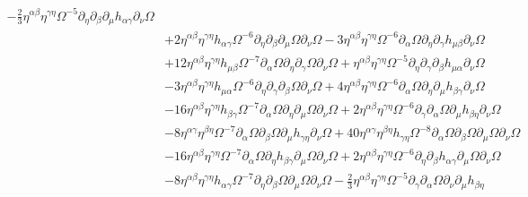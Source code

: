 \documentclass[10pt,letterpaper]{article}
\begin{document}
\begin{align}
 -  \tfrac{2}{3} \eta^{\alpha \beta} \eta^{\gamma \eta} \Omega^{-5} \partial_{\eta}\partial_{\beta}\partial_{\mu}h_{\alpha \gamma} \partial_{\nu}\Omega\nonumber\\
& + 2 \eta^{\alpha \beta} \eta^{\gamma \eta} h_{\alpha \gamma} \Omega^{-6} \partial_{\eta}\partial_{\beta}\partial_{\mu}\Omega \partial_{\nu}\Omega
 - 3 \eta^{\alpha \beta} \eta^{\gamma \eta} \Omega^{-6} \partial_{\alpha}\Omega \partial_{\eta}\partial_{\gamma}h_{\mu \beta} \partial_{\nu}\Omega\nonumber\\
& + 12 \eta^{\alpha \beta} \eta^{\gamma \eta} h_{\mu \beta} \Omega^{-7} \partial_{\alpha}\Omega \partial_{\eta}\partial_{\gamma}\Omega \partial_{\nu}\Omega
 + \eta^{\alpha \beta} \eta^{\gamma \eta} \Omega^{-5} \partial_{\eta}\partial_{\gamma}\partial_{\beta}h_{\mu \alpha} \partial_{\nu}\Omega\nonumber\\
& - 3 \eta^{\alpha \beta} \eta^{\gamma \eta} h_{\mu \alpha} \Omega^{-6} \partial_{\eta}\partial_{\gamma}\partial_{\beta}\Omega \partial_{\nu}\Omega
 + 4 \eta^{\alpha \beta} \eta^{\gamma \eta} \Omega^{-6} \partial_{\alpha}\Omega \partial_{\eta}\partial_{\mu}h_{\beta \gamma} \partial_{\nu}\Omega\nonumber\\
& - 16 \eta^{\alpha \beta} \eta^{\gamma \eta} h_{\beta \gamma} \Omega^{-7} \partial_{\alpha}\Omega \partial_{\eta}\partial_{\mu}\Omega \partial_{\nu}\Omega
 + 2 \eta^{\alpha \beta} \eta^{\gamma \eta} \Omega^{-6} \partial_{\gamma}\partial_{\alpha}\Omega \partial_{\mu}h_{\beta \eta} \partial_{\nu}\Omega\nonumber\\
& - 8 \eta^{\alpha \gamma} \eta^{\beta \eta} \Omega^{-7} \partial_{\alpha}\Omega \partial_{\beta}\Omega \partial_{\mu}h_{\gamma \eta} \partial_{\nu}\Omega
 + 40 \eta^{\alpha \gamma} \eta^{\beta \eta} h_{\gamma \eta} \Omega^{-8} \partial_{\alpha}\Omega \partial_{\beta}\Omega \partial_{\mu}\Omega \partial_{\nu}\Omega\nonumber\\
& - 16 \eta^{\alpha \beta} \eta^{\gamma \eta} \Omega^{-7} \partial_{\alpha}\Omega \partial_{\eta}h_{\beta \gamma} \partial_{\mu}\Omega \partial_{\nu}\Omega
 + 2 \eta^{\alpha \beta} \eta^{\gamma \eta} \Omega^{-6} \partial_{\eta}\partial_{\beta}h_{\alpha \gamma} \partial_{\mu}\Omega \partial_{\nu}\Omega\nonumber\\
& - 8 \eta^{\alpha \beta} \eta^{\gamma \eta} h_{\alpha \gamma} \Omega^{-7} \partial_{\eta}\partial_{\beta}\Omega \partial_{\mu}\Omega \partial_{\nu}\Omega
 -  \tfrac{2}{3} \eta^{\alpha \beta} \eta^{\gamma \eta} \Omega^{-5} \partial_{\gamma}\partial_{\alpha}\Omega \partial_{\nu}\partial_{\mu}h_{\beta \eta}\nonumber\\

\end{align}
\end{document}
